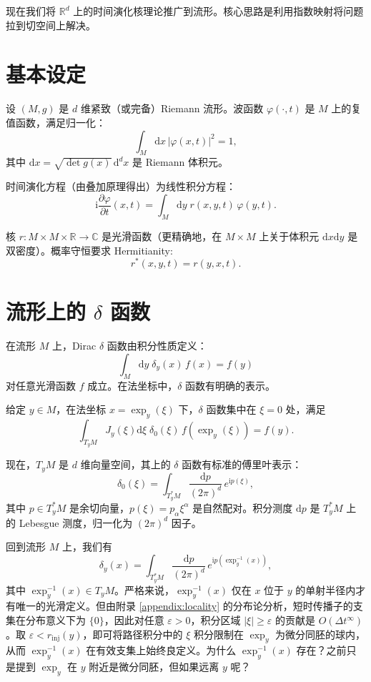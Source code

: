 \documentclass{book}
\newcommand{\mathd}{\mathrm{d}}
\newcommand{\mathi}{\mathrm{i}}
\newcommand{\mathpi}{\pi}
\newcommand{\todo}[1]{{\color{red}#1}}
\begin{document}
现在我们将 $\mathbb{R}^d$ 上的时间演化核理论推广到流形。核心思路是利用指数映射将问题拉到切空间上解决。

\section{基本设定}

设 $(M,g)$ 是 $d$ 维紧致（或完备）Riemann 流形。波函数 $\varphi(\cdot,t)$ 是 $M$ 上的复值函数，满足归一化：
\[
\int_M \mathd x \, |\varphi(x,t)|^2 = 1,
\]
其中 $\mathd x = \sqrt{\det g(x)} \, \mathd^d x$ 是 Riemann 体积元。

时间演化方程（由叠加原理得出）为线性积分方程：
\begin{equation}
  \mathi \frac{\partial\varphi}{\partial t}(x,t) = \int_M \mathd y \; r(x,y,t) \, \varphi(y,t). \label{eq:evolution}
\end{equation}

核 $r: M \times M \times \mathbb{R} \to \mathbb{C}$ 是光滑函数（更精确地，在 $M\times M$ 上关于体积元 $\mathd x \mathd y$ 是双密度）。概率守恒要求 Hermitianity:
\begin{equation}
  r^*(x,y,t) = r(y,x,t). \label{eq:herm}
\end{equation}

\section{流形上的 $\delta$ 函数}

在流形 $M$ 上，Dirac $\delta$ 函数由积分性质定义：
\[
\int_M \mathd y \; \delta_y(x) \, f(x) = f(y)
\]
对任意光滑函数 $f$ 成立。在法坐标中，$\delta$ 函数有明确的表示。

给定 $y \in M$，在法坐标 $x = \exp_y(\xi)$ 下，$\delta$ 函数集中在 $\xi=0$ 处，满足
\[
\int_{T_yM} J_y(\xi) \mathd \xi \; \delta_0(\xi) \, f(\exp_y(\xi)) = f(y).
\]

现在，$T_yM$ 是 $d$ 维向量空间，其上的 $\delta$ 函数有标准的傅里叶表示：
\[
\delta_0(\xi) = \int_{T_y^*M} \frac{\mathd p}{(2\mathpi)^d} \, e^{\mathi p(\xi)},
\]
其中 $p \in T_y^*M$ 是余切向量，$p(\xi) = p_\alpha \xi^\alpha$ 是自然配对。积分测度 $\mathd p$ 是 $T_y^*M$ 上的 Lebesgue 测度，归一化为 $(2\mathpi)^d$ 因子。

回到流形 $M$ 上，我们有
\begin{equation}
  \delta_y(x) = \int_{T_y^*M} \frac{\mathd p}{(2\mathpi)^d} \, e^{\mathi p(\exp_y^{-1}(x))}, \label{eq:delta-manifold}
\end{equation}
其中 $\exp_y^{-1}(x) \in T_yM$。严格来说，$\exp_y^{-1}(x)$ 仅在 $x$ 位于 $y$ 的单射半径内才有唯一的光滑定义。但由附录 \ref{appendix:locality} 的分布论分析，短时传播子的支集在分布意义下为 $\{0\}$，因此对任意 $\varepsilon > 0$，积分区域 $|\xi| \ge \varepsilon$ 的贡献是 $O(\Delta t^\infty)$。取 $\varepsilon < r_{\mathrm{inj}}(y)$，即可将路径积分中的 $\xi$ 积分限制在 $\exp_y$ 为微分同胚的球内，从而 $\exp_y^{-1}(x)$ 在有效支集上始终良定义。\todo{为什么 $\exp_y^{-1}(x)$ 存在？之前只是提到 $\exp_y$ 在 $y$ 附近是微分同胚，但如果远离 $y$ 呢？}
\end{document}
